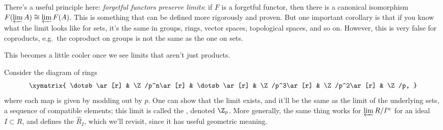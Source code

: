 There's a useful principle here: \emph{forgetful functors preserve limits}: if \(F\) is a forgetful functor, then
there is a canonical isomorphism \(F(\varprojlim A)\cong\varprojlim F(A)\). This is something that can be defined
more rigorously and proven. But one important corollary is that if you know what the limit looks like for sets,
it's the same in groups, rings, vector spaces, topological spaces, and so on. However, this is very false for
coproducts, e.g.\ the coproduct on groups is not the same as the one on sets.

This becomes a little cooler once we see limits that aren't just products.
\begin{exm}
Consider the diagram of rings
\[\xymatrix{
\dotsb\ar[r] & \Z/p^n\ar[r] & \dotsb\ar[r] & \Z/p^3\ar[r] & \Z/p^2\ar[r] & \Z/p,
}\]
where each map is given by modding out by \(p\). One can show that the limit exists, and it'll be the same as
the limit of the underlying sets, a sequence of compatible elements; this limit is called the , denoted \(\Z_p\). More generally, the same thing works for \(\varprojlim R/I^n\) for an ideal \(I\subset
R\), and defines the  \(\widehat R_I\), which we'll revisit, since it has useful
geometric meaning.
\end{exm}
